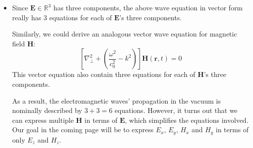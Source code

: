 \documentclass[11pt, a4paper]{article}
\renewcommand{\vec}[1]{\bm{#1}} %
\renewcommand{\r}{\vec{r}}
\newcommand{\E}{\vec{E}}  %
\renewcommand{\H}{\vec{H}}  %
\begin{document}
\begin{itemize}
	\item Since $ \E \in \mathbb{R}^{3} $ has three components, the above wave equation in vector form really has 3 equations for each of $ \E $'s three components. 
	
	Similarly, we could derive an analogous vector wave equation for magnetic field $ \H $:
	\begin{equation*}
		\left[\nabla_{\perp}^{2} + \left(\frac{\omega^{2}}{c_{0}^{2}} - k^{2}\right)\right]\H(\r, t) = 0
	\end{equation*}
	This vector equation also contain three equations for each of $ \H $'s three components.
	
	As a result, the electromagnetic waves' propagation in the vacuum is nominally described by $ 3 + 3 = 6 $ equations. However, it turns out that we can express multiple $ \H $ in terms of $ \E $, which simplifies the equations involved. Our goal in the coming page will be to express $ E_{x} $, $ E_{y} $, $ H_{x} $ and $ H_{y} $ in terms of only $ E_{z} $ and $ H_{z} $.
	
\end{itemize}
\end{document}
